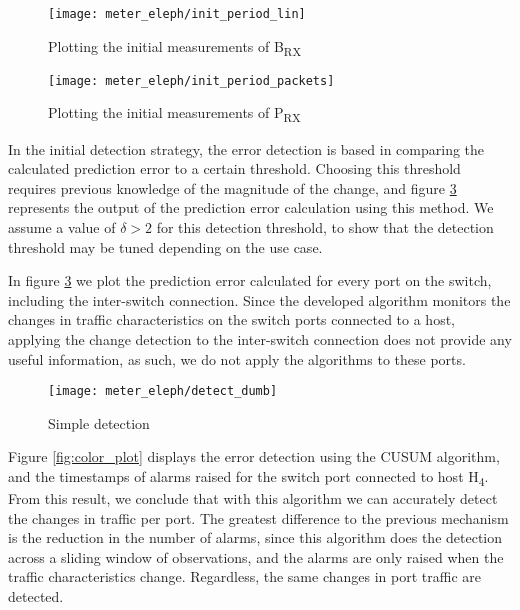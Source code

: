 \begin{figure}[H]
    \centering
    \texttt{[image: meter\_eleph/init\_period\_lin]}
    \caption {Plotting the initial measurements of B\textsubscript{RX}}
    \label{fig:init_plot}
\end{figure} 

\begin{figure}[H]
    \centering
    \texttt{[image: meter\_eleph/init\_period\_packets]}
    \caption {Plotting the initial measurements of P\textsubscript{RX}}
    \label{fig:init_plot_pkts}
\end{figure} 

\par In the initial detection strategy, the error detection is based in comparing the calculated prediction error to a certain threshold. Choosing this threshold 
requires previous knowledge of the magnitude of the change, and figure \ref{fig:detect_dumb} represents the output of the prediction error calculation using this
method. We assume a value of $\delta > 2$ for this detection threshold, to show that the detection threshold may be tuned depending on the use case.

\par In figure \ref{fig:detect_dumb} we plot the prediction error calculated for every port on the switch, including the inter-switch connection. Since the developed
algorithm monitors the changes in traffic characteristics on the switch ports connected to a host, applying the change detection to the inter-switch connection
does not provide any useful information, as such, we do not apply the algorithms to these ports.

\begin{figure}[H]
    \centering
    \texttt{[image: meter\_eleph/detect\_dumb]}
    \caption {Simple detection}
    \label{fig:detect_dumb}
\end{figure} 

\par Figure \ref{fig:color_plot} displays the error detection using the CUSUM algorithm, and the timestamps of alarms raised for the switch port connected to
host H\textsubscript{4}. From this result, we conclude that with this algorithm we can accurately detect the changes in traffic per port. The greatest difference to
the previous mechanism is the reduction in the number of alarms, since this algorithm does the detection across a sliding window of observations, and the alarms are
only raised when the traffic characteristics change. Regardless, the same changes in port traffic are detected.

